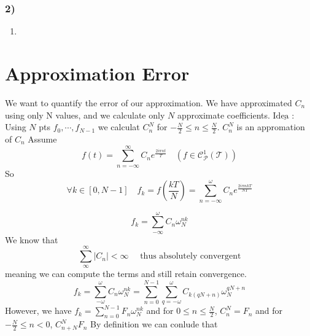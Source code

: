 \subsubsection{2)}
\begin{enumerate}[label={(\alph*)}]
    \item 
\end{enumerate}
























































\section{Approximation Error}
\label{sec:Approximation Error}
We want to quantify the error of our approximation. We have approximated $ C_n $ using
only N values, and we calculate only $ N $ approximate coefficients. 
$ \underline{\text{Idea : } } $ Using $ N $ pts $ f_0, \cdots , f_{N-1} $ we calculat $
C^N_n $ for $ -\frac{ N }{ 2 } \leq n \leq \frac{ N }{ 2 }  $. $ C_n^N $ is an appromation
of $ C_n $ Assume 
\[
f(t) = \sum_{n=-\infty}^{\infty} C_n e _{  }^{ \frac{ 2i\pi nt }{ T }  } \quad \left( f\in
\mathscr{ C_P^1(T) } \right) 
\]
So 
\[
    \forall k \in [0, N-1] \quad f_k = f\left( \frac{ kT }{ N } \right) =
    \sum_{n=-\infty}^{\omega} C_n e _{  }^{ \frac{ 2i\pi n k T }{ NT }  } 
\]

\[
f_k = \sum_{-\infty}^{\omega} C_n \omega _{ N }^{ nk } 
\]
We know that
\[
\sum_{\infty}^{\infty} \left | C_n \right | < \infty \quad \text{ thus absolutely
convergent} 

\]
meaning we can compute the terms and still retain convergence. 
\[
f_k = \sum_{-\omega}^{\omega} C_n\omega _{ N }^{ nk } = \sum_{n=0}^{N-1}
\sum_{q=-\omega}^{\omega} C _{k( qN+n) }^{  } \omega _{ N }^{ qN + n  } 
\]
However, we have $ f_k = \sum_{n=0}^{N-1} F_n \omega _{ N }^{ nk }  $ and for $ 0 \leq n
\leq \frac{ N }{ 2 }  $, $ C^N_n = F_n $ and for $ - \frac{ N }{ 2 } \leq n < 0 $, $ C _{
n+ N}^{ N } F_n $ By definition we can conlude that 

